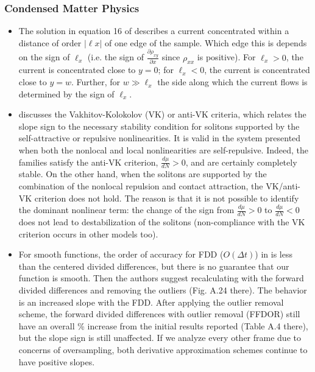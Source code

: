 \documentclass[11pt]{book}
\begin{document}
\subsubsection{Condensed Matter Physics}
\begin{itemize}
\item The solution in equation 16 of \cite{ilan2006longitudinal}
describes a current concentrated within a distance of order $\left|\ell x\right|$
of one edge of the sample. Which edge this is depends on the sign
of $\ell_{x}$ (i.e. the sign of $\frac{\partial\rho_{xy}}{\partial x}$
since $\rho_{xx}$ is positive). For $\ell_{x}>0$, the current is
concentrated close to $y=0$; for $\ell_{x}<0$, the current is concentrated
close to $y=w$. Further, for $w\gg\ell_{x}$ the side along which
the current flows is determined by the sign of $\ell_{x}$.
\item \cite{fan2020gap}
discusses the Vakhitov-Kolokolov (VK) or anti-VK criteria, which relates
the slope sign to the necessary stability condition for solitons supported
by the self-attractive or repulsive nonlinearities. It is valid in
the system presented when both the nonlocal and local nonlinearities
are self-repulsive. Indeed, the families satisfy the anti-VK criterion,
$\frac{d\mu}{dN}>0$, and are certainly completely stable. On the
other hand, when the solitons are supported by the combination of
the nonlocal repulsion and contact attraction, the VK/anti-VK criterion
does not hold. The reason is that it is not possible to identify the
dominant nonlinear term: the change of the sign from $\frac{d\mu}{dN}>0$
to $\frac{d\mu}{dN}<0$ does not lead to destabilization of the solitons
(non-compliance with the VK criterion occurs in other models too).
\item For smooth functions, the order of accuracy for FDD ($O\left(\Delta t\right)$)
in \cite{morgan2020quantifying}
is less than the centered divided differences, but there is no guarantee
that our function is smooth. Then the authors suggest recalculating
with the forward divided differences and removing the outliers (Fig.
A.24 there). The behavior is an increased slope with the FDD. After
applying the outlier removal scheme, the forward divided differences
with outlier removal (FFDOR) still have an overall \% increase from
the initial results reported (Table A.4 there), but the slope sign
is still unaffected. If we analyze every other frame due to concerns
of oversampling, both derivative approximation schemes continue to
have positive slopes.
\end{itemize}
\end{document}
